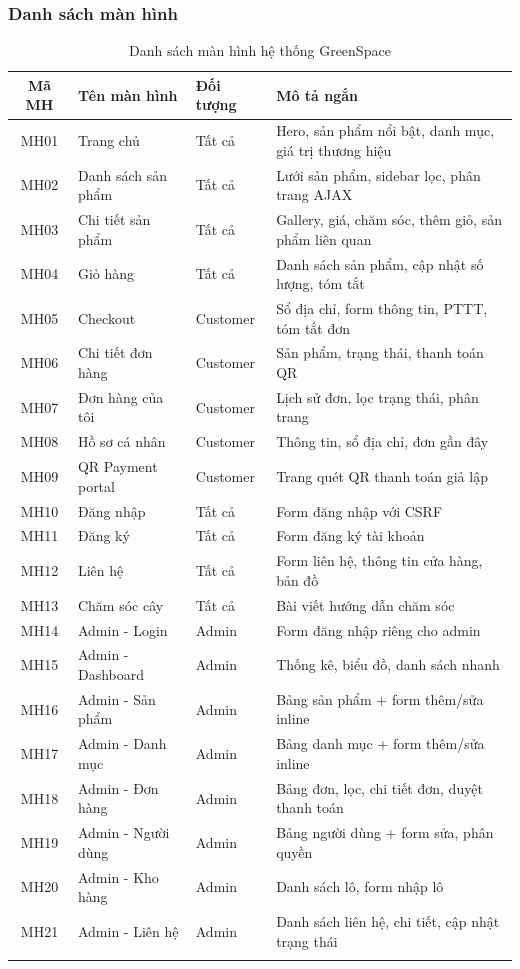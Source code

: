 \documentclass[a4paper]{article}
\begin{document}
\subsubsection{Danh sách màn hình}

\begin{longtable}{|c|p{3.5cm}|p{2.5cm}|p{5.5cm}|}
\hline
\textbf{Mã MH} & \textbf{Tên màn hình} & \textbf{Đối tượng} & \textbf{Mô tả ngắn} \\
\hline
\endhead
MH01 & Trang chủ & Tất cả & Hero, sản phẩm nổi bật, danh mục, giá trị thương hiệu \\
\hline
MH02 & Danh sách sản phẩm & Tất cả & Lưới sản phẩm, sidebar lọc, phân trang AJAX \\
\hline
MH03 & Chi tiết sản phẩm & Tất cả & Gallery, giá, chăm sóc, thêm giỏ, sản phẩm liên quan \\
\hline
MH04 & Giỏ hàng & Tất cả & Danh sách sản phẩm, cập nhật số lượng, tóm tắt \\
\hline
MH05 & Checkout & Customer & Sổ địa chỉ, form thông tin, PTTT, tóm tắt đơn \\
\hline
MH06 & Chi tiết đơn hàng & Customer & Sản phẩm, trạng thái, thanh toán QR \\
\hline
MH07 & Đơn hàng của tôi & Customer & Lịch sử đơn, lọc trạng thái, phân trang \\
\hline
MH08 & Hồ sơ cá nhân & Customer & Thông tin, sổ địa chỉ, đơn gần đây \\
\hline
MH09 & QR Payment portal & Customer & Trang quét QR thanh toán giả lập \\
\hline
MH10 & Đăng nhập & Tất cả & Form đăng nhập với CSRF \\
\hline
MH11 & Đăng ký & Tất cả & Form đăng ký tài khoản \\
\hline
MH12 & Liên hệ & Tất cả & Form liên hệ, thông tin cửa hàng, bản đồ \\
\hline
MH13 & Chăm sóc cây & Tất cả & Bài viết hướng dẫn chăm sóc \\
\hline
MH14 & Admin - Login & Admin & Form đăng nhập riêng cho admin \\
\hline
MH15 & Admin - Dashboard & Admin & Thống kê, biểu đồ, danh sách nhanh \\
\hline
MH16 & Admin - Sản phẩm & Admin & Bảng sản phẩm + form thêm/sửa inline \\
\hline
MH17 & Admin - Danh mục & Admin & Bảng danh mục + form thêm/sửa inline \\
\hline
MH18 & Admin - Đơn hàng & Admin & Bảng đơn, lọc, chi tiết đơn, duyệt thanh toán \\
\hline
MH19 & Admin - Người dùng & Admin & Bảng người dùng + form sửa, phân quyền \\
\hline
MH20 & Admin - Kho hàng & Admin & Danh sách lô, form nhập lô \\
\hline
MH21 & Admin - Liên hệ & Admin & Danh sách liên hệ, chi tiết, cập nhật trạng thái \\
\hline
\caption{Danh sách màn hình hệ thống GreenSpace}
\end{longtable}
\end{document}
